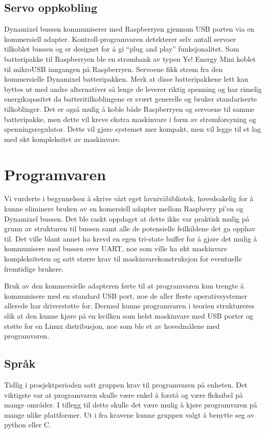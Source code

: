 \documentclass[12pt]{report}
\begin{document}
\subsection{Servo oppkobling}
Dynamixel bussen kommuniserer med Raspberryen gjennom USB porten via en kommersiell adapter\cite{USBadapter}. Kontroll-programvaren detekterer selv antall servoer tilkoblet bussen og er designet for å gi “plug and play” funksjonalitet. Som batteripakke til Raspberryen ble en strømbank av typen Ye! Energy Mini\cite{Energybank} koblet til mikroUSB inngangen på Raspberryen. Servoene fikk strøm fra den kommersielle Dynamixel batteripakken. Merk at disse batteripakkene lett kan byttes ut med andre alternativer så lenge de leverer riktig spenning og har rimelig energikapasitet da batteritilkoblingene er svært generelle og bruker standariserte tilkoblinger. Det er også mulig å koble både Raspberryen og servoene til samme batteripakke, men dette vil kreve ekstra maskinvare i form av strømforsyning og spenningsregulator. Dette vil gjøre systemet mer kompakt, men vil legge til et lag med økt kompleksitet av maskinvare.

\section{Programvaren}
Vi vurderte i begynnelsen å skrive vårt eget lavnivåbibliotek, hovedsakelig for å kunne eliminere bruken av en komersiell adapter mellom Raspberry pi’en og Dynamixel bussen. Det ble raskt oppdaget at dette ikke var praktisk mulig på grunn av strukturen til bussen samt alle de potensielle feilkildene det ga opphav til. Det ville blant annet ha krevd en egen tri-state buffer for å gjøre det mulig å kommunisere med bussen over UART, noe som ville ha økt maskinvare kompleksiteten og satt større krav til maskinvarekonstruksjon for eventuelle fremtidige brukere.

Bruk av den kommersielle adapteren førte til at programvaren kun trengte å kommunisere med en standard USB port, noe de aller fleste operativsystemer allerede har driverstøtte for. Dermed kunne programvaren i teorien struktureres slik at den kunne kjøre på en hvilken som helst maskinvare med USB porter og støtte for en Linux distribusjon, noe som ble et av hovedmålene med programvaren.

\subsection{Språk}
Tidlig i prosjektperioden satt gruppen krav til programvaren på enheten. Det viktigste var at programvaren skulle være enkel å forstå og være fleksibel på mange områder. I tillegg til dette skulle det være mulig å kjøre programvaren på mange ulike plattformer. Ut i fra kravene kunne gruppen valgt å benytte seg av python eller C. 
\end{document}
